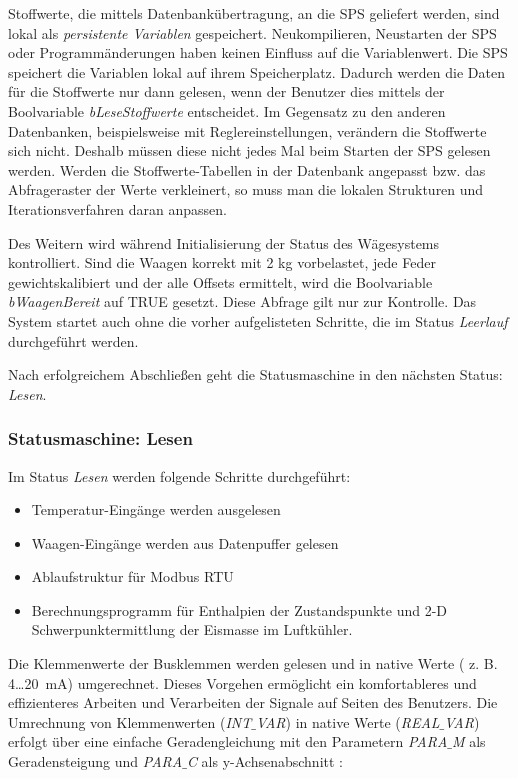 Stoffwerte, die mittels Datenbankübertragung, an die SPS geliefert werden, sind lokal als \textit{persistente Variablen} gespeichert. Neukompilieren, Neustarten der SPS oder Programmänderungen haben keinen Einfluss auf die Variablenwert. Die SPS speichert die Variablen lokal auf ihrem Speicherplatz. Dadurch werden die Daten für die Stoffwerte nur dann gelesen, wenn der Benutzer dies mittels der Boolvariable \textit{bLeseStoffwerte} entscheidet. Im Gegensatz zu den anderen Datenbanken, beispielsweise mit Reglereinstellungen, verändern die Stoffwerte sich nicht. Deshalb müssen diese nicht jedes Mal beim Starten der SPS gelesen werden. Werden die Stoffwerte-Tabellen in der Datenbank angepasst bzw. das Abfrageraster der Werte verkleinert, so muss man die lokalen Strukturen und Iterationsverfahren daran anpassen. 

Des Weitern wird während Initialisierung der Status des Wägesystems kontrolliert. Sind die Waagen korrekt mit 2 kg vorbelastet, jede Feder gewichtskalibiert und der alle Offsets ermittelt, wird die Boolvariable  \textit{bWaagenBereit} auf TRUE gesetzt. Diese Abfrage gilt nur zur Kontrolle. Das System startet auch ohne die vorher aufgelisteten Schritte, die im Status \textit{Leerlauf} durchgeführt werden. 


Nach erfolgreichem Abschließen geht die Statusmaschine in den nächsten Status: \textit{Lesen}.

\subsubsection*{Statusmaschine: Lesen}

Im Status \textit{Lesen} werden folgende Schritte durchgeführt: 

\begin{itemize}
\item	Temperatur-Eingänge werden ausgelesen
\item	Waagen-Eingänge werden aus Datenpuffer gelesen
\item	Ablaufstruktur für Modbus RTU
\item 	Berechnungsprogramm für Enthalpien der Zustandspunkte und 2-D Schwerpunktermittlung der Eismasse im Luftkühler.
\end{itemize} 

Die Klemmenwerte der Busklemmen werden gelesen und in native Werte ( z. B. 4\dots20~mA) umgerechnet. Dieses Vorgehen ermöglicht ein komfortableres und effizienteres Arbeiten und Verarbeiten der Signale auf Seiten des Benutzers. Die Umrechnung von Klemmenwerten (\textit{INT$\_$VAR}) in native Werte (\textit{REAL$\_$VAR}) erfolgt über eine einfache Geradengleichung mit den Parametern \textit{PARA$\_$M} als Geradensteigung und \textit{PARA$\_$C} als y-Achsenabschnitt :

